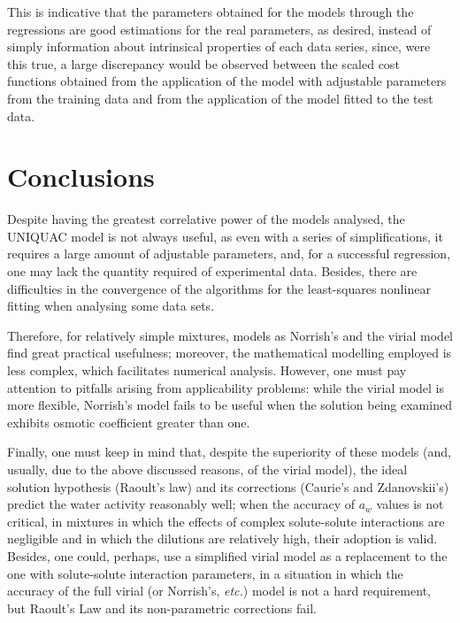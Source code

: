 \documentclass[
	12pt,				%
	openright,
	twoside,
	a4paper,			%
	brazil,			%
	french,				%
	english				%
	]{abntex2}
\begin{document}
This is indicative that the parameters obtained for the models through the
regressions are good estimations for the real parameters, as desired, instead of
simply information about intrinsical properties of each data series, since, were
this true, a large discrepancy would be observed between the scaled cost functions
obtained from the application of the model with adjustable parameters from the
training data and from the application of the model fitted to the test data.


\part{Conclusions}

Despite having the greatest correlative power of the models analysed, the UNIQUAC
model is not always useful, as even with a series of simplifications, it requires
a large amount of adjustable parameters, and, for a successful regression, one may
lack the quantity required of experimental data. Besides, there are difficulties in
the convergence of the algorithms for the least-squares nonlinear fitting when
analysing some data sets.

Therefore, for relatively simple mixtures, models as Norrish's and the virial model
find great practical usefulness; moreover, the mathematical modelling employed is
less complex, which facilitates numerical analysis. However, one must pay attention
to pitfalls arising from applicability problems: while the virial model is more
flexible, Norrish's model fails to be useful when the solution being examined
exhibits osmotic coefficient greater than one.

Finally, one must keep in mind that, despite the superiority of these models (and,
usually, due to the above discussed reasons, of the virial model), the ideal
solution hypothesis (Raoult's law) and its corrections (Caurie's and Zdanovskii's)
predict the water activity reasonably well; when the accuracy of $a_w$ values is
not critical, in mixtures in which the effects of complex solute-solute interactions
are negligible and in which the dilutions are relatively high, their adoption is
valid. Besides, one could, perhaps, use a simplified virial model as a replacement
to the one with solute-solute interaction parameters, in a situation in which the
accuracy of the full virial (or Norrish's, \textit{etc.}) model is not a hard
requirement, but Raoult's Law and its non-parametric corrections fail.

\end{document}
